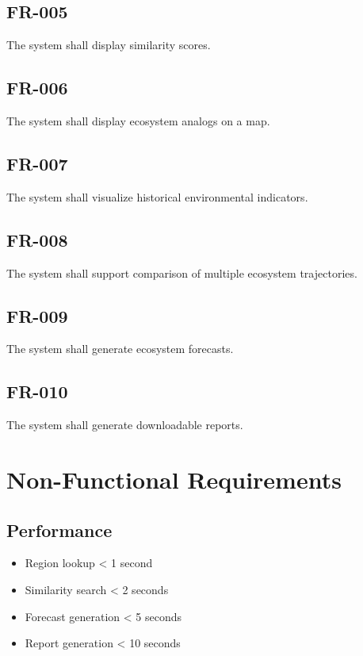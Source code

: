 \documentclass[11pt,a4paper]{article}
\begin{document}
\subsection{FR-005}

The system shall display similarity scores.

\subsection{FR-006}

The system shall display ecosystem analogs on a map.

\subsection{FR-007}

The system shall visualize historical environmental indicators.

\subsection{FR-008}

The system shall support comparison of multiple ecosystem trajectories.

\subsection{FR-009}

The system shall generate ecosystem forecasts.

\subsection{FR-010}

The system shall generate downloadable reports.

\section{Non-Functional Requirements}

\subsection{Performance}

\begin{itemize}
\item Region lookup < 1 second
\item Similarity search < 2 seconds
\item Forecast generation < 5 seconds
\item Report generation < 10 seconds
\end{itemize}
\end{document}
